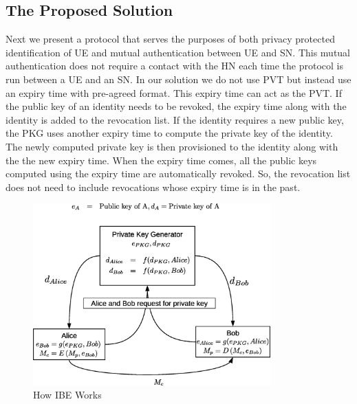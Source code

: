 \documentclass{river-journal}
\begin{document}
\subsection{The Proposed Solution}
Next we present a protocol that serves the purposes of both privacy protected identification of UE and mutual authentication between UE and SN. This mutual authentication does not require a contact with the HN each time the protocol is run between a UE and an SN. In our solution we do not use PVT but instead use an expiry time with pre-agreed format. This expiry time can act as the PVT. If the public key of an identity needs to be revoked, the expiry time along with the identity is added to the revocation list. If the identity requires a new public key, the PKG uses another expiry time to compute the private key of the identity. The newly computed private key is then provisioned to the identity along with the the new expiry time. When the expiry time comes, all the public keys computed using the expiry time are automatically revoked. So, the revocation list does not need to include revocations whose expiry time is in the past.


\begin{figure}
\begin{center}
  \includegraphics[height=7cm]{how_IBE_works.eps}
\caption{How IBE Works}
\label{fig:how_IBE_works}       %
\end{center}
\end{figure}
\end{document}
